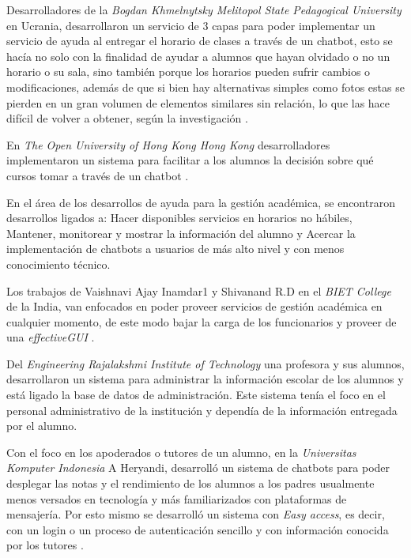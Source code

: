     \par Desarrolladores de la \textit{Bogdan Khmelnytsky Melitopol State Pedagogical University} en Ucrania, desarrollaron un servicio de 3 capas para poder implementar un servicio de ayuda al entregar el horario de clases a través de un chatbot, esto se hacía no solo con la finalidad de ayudar a alumnos que hayan olvidado o no un horario o su sala, sino también porque los horarios pueden sufrir cambios o modificaciones, además de que si bien hay alternativas simples como fotos estas se pierden en un gran volumen de elementos similares sin relación, lo que las hace difícil de volver a obtener, según la investigación \cite{Priadko2019}.
    
    \par En \textit{The Open University of Hong Kong Hong Kong} desarrolladores implementaron un sistema para facilitar a los alumnos la decisión sobre qué cursos tomar a través de un chatbot \cite{ChunHo2018}.
    
    \par En el área de los desarrollos de ayuda para la gestión académica, se encontraron desarrollos ligados a: Hacer disponibles servicios en horarios no hábiles, Mantener, monitorear y mostrar la información del alumno y Acercar la implementación de chatbots a usuarios de más alto nivel y con menos conocimiento técnico.
    
    \par Los trabajos de Vaishnavi Ajay Inamdar1 y Shivanand R.D en el \textit{BIET College} de la India, van enfocados en poder proveer servicios de gestión académica en cualquier momento, de este modo bajar la carga de los funcionarios y proveer de una \textit{\gls{effectiveGUI}} \cite{Journal2019}.
    
    \par Del \textit{Engineering Rajalakshmi Institute of Technology} una profesora y sus alumnos, desarrollaron un sistema para administrar la información escolar de los alumnos y está ligado la base de datos de administración. Este sistema tenía el foco en el personal administrativo de la institución y dependía de la información entregada por el alumno.
    
    \par Con el foco en los apoderados o tutores de un alumno, en la \textit{Universitas Komputer Indonesia} A Heryandi, desarrolló un sistema de chatbots para poder desplegar las notas y el rendimiento de los alumnos a los padres usualmente menos versados en tecnología y más familiarizados con plataformas de mensajería. Por esto mismo se desarrolló un sistema con \textit{Easy access}, es decir, con un login o un proceso de autenticación sencillo y con información conocida por los tutores \cite{Heryandi2020}.
    

